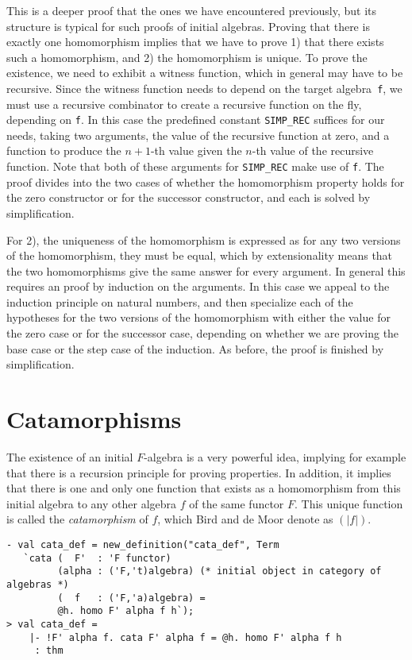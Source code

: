 This is a deeper proof that the ones we have encountered previously, but its structure
is typical for such proofs of initial algebras. 
Proving that there is exactly one homomorphism implies that we have to prove 1)
that there exists such a homomorphism, and 2) the homomorphism is unique.
To prove the existence, we need to exhibit a witness function, which in general may 
have to be recursive. Since the witness function needs to depend on 
the target algebra~\texttt{f}, we must use a recursive combinator to create a recursive
function on the fly, depending on \texttt{f}. In this case the predefined \HOL{} constant 
\texttt{SIMP\_REC}
suffices for our needs, taking two arguments, the value of the recursive function
at zero, and a function to produce the $n+1$-th value given the $n$-th value of the
recursive function. Note that both of these arguments for \texttt{SIMP\_REC} 
make use of \texttt{f}.
The proof divides into the two cases of whether the homomorphism property holds
for the zero constructor or for the successor constructor, and each is solved by
simplification.

For 2), the uniqueness of the homomorphism is expressed as for any two versions of the
homomorphism, they must be equal, which by extensionality means that the two
homomorphisms give the same answer for every argument. In general this requires an proof by
induction on the arguments. In this case we appeal to the induction principle on natural 
numbers, and then specialize each of the hypotheses for the two versions of the homomorphism 
with either the value for the zero case or for the successor case, depending on whether
we are proving the base case or the step case of the induction. As before, the proof
is finished by simplification.

\section{Catamorphisms}

The existence of an initial $F$-algebra is a very powerful idea, implying for example
that there is a recursion principle for proving properties. In addition, it implies
that there is one and only one function that exists as a homomorphism from
this initial algebra to any other algebra $f$ of the same functor $F$. This unique
function is called the {\it catamorphism}\/ of $f$, which Bird and de Moor denote as
$(\!|f|\!)$.
\begin{session}
\begin{verbatim}
- val cata_def = new_definition("cata_def", Term
   `cata (  F'  : 'F functor)
         (alpha : ('F,'t)algebra) (* initial object in category of algebras *)
         (  f   : ('F,'a)algebra) =
         @h. homo F' alpha f h`);
> val cata_def =
    |- !F' alpha f. cata F' alpha f = @h. homo F' alpha f h
     : thm
\end{verbatim}
\end{session}

